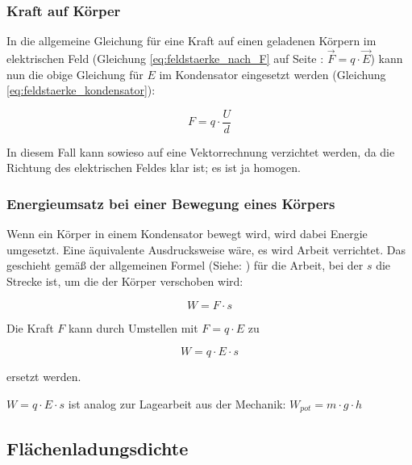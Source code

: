 \subsubsection{Kraft auf Körper}

In die allgemeine Gleichung für eine Kraft auf einen geladenen Körpern im elektrischen Feld (Gleichung \ref{eq:feldstaerke_nach_F} auf Seite \pageref{eq:feldstaerke_nach_F}: $\vec{F} = q \cdot \vec{E}$) kann nun die obige Gleichung für $E$ im Kondensator eingesetzt werden (Gleichung \ref{eq:feldstaerke_kondensator}):

\begin{equation} \label{eq:kraft_kondensator}
	F = q \cdot \frac{U}{d}
\end{equation}

In diesem Fall kann sowieso auf eine Vektorrechnung verzichtet werden, da die Richtung des elektrischen Feldes klar ist; es ist ja homogen.

\subsubsection{Energieumsatz bei einer Bewegung eines Körpers}

Wenn ein Körper in einem Kondensator bewegt wird, wird dabei Energie umgesetzt. Eine äquivalente Ausdrucksweise wäre, es wird \glqq Arbeit verrichtet\grqq . Das geschieht gemäß der allgemeinen Formel (Siehe: ) für die Arbeit, bei der $s$ die Strecke ist, um die der Körper verschoben wird:

\begin{equation} \label{eq:arbeit}
	W = F \cdot s
\end{equation}

\noindent Die Kraft $F$ kann durch Umstellen mit $F = q \cdot E$ zu

\begin{equation} \label{eq:arbeit_kondensator}
	W = q \cdot E \cdot s
\end{equation}

\noindent ersetzt werden.

\begin{NiceToKnow}
$W = q \cdot E \cdot s$ ist analog zur Lagearbeit aus der Mechanik: $W_{pot} = m \cdot g \cdot h$
\end{NiceToKnow}


\subsection{Flächenladungsdichte}

